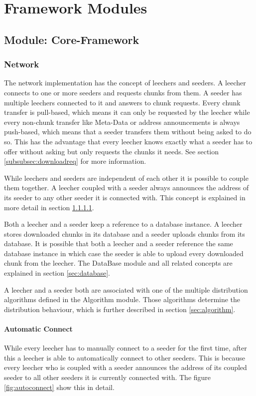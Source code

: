 \chapter{Framework Modules}
\label{ch:framework}

\section{Module: Core-Framework}
\label{sec:core}
\subsection{Network}
The network implementation has the concept of leechers and seeders. A leecher connects to one or more seeders and requests chunks from them. A seeder has multiple leechers connected to it and answers to chunk requests. Every chunk transfer is pull-based, which means it can only be requested by the leecher while every non-chunk transfer like Meta-Data or address announcements is always push-based, which means that a seeder transfers them without being asked to do so. This has the advantage that every leecher knows exactly what a seeder has to offer without asking but only requests the chunks it needs. See section \ref{subsubsec:downloadreq} for more information.

While leechers and seeders are independent of each other it is possible to couple them together. A leecher coupled with a seeder always announces the address of its seeder to any other seeder it is connected with. This concept is explained in more detail in section \ref{subsubsec:autoconnect}.

Both a leecher and a seeder keep a reference to a database instance. A leecher stores downloaded chunks in its database and a seeder uploads chunks from its database. It is possible that both a leecher and a seeder reference the same database instance in which case the seeder is able to upload every downloaded chunk from the leecher. The DataBase module and all related concepts are explained in section \ref{sec:database}.

A leecher and a seeder both are associated with one of the multiple distribution algorithms defined in the Algorithm module. Those algorithms determine the distribution behaviour, which is further described in section \ref{sec:algorithm}.

\subsubsection{Automatic Connect}
\label{subsubsec:autoconnect}
While every leecher has to manually connect to a seeder for the first time, after this a leecher is able to automatically connect to other seeders. This is because every leecher who is coupled with a seeder announces the address of its coupled seeder to all other seeders it is currently connected with. The figure \ref{fig:autoconnect} show this in detail.

